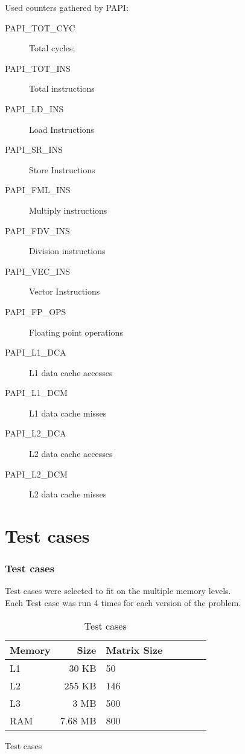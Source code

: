\documentclass{beamer}
\begin{document}
\begin{frame}
\begin{figure}[!htp]
\begin{frame}
	Used counters gathered by PAPI:
	\begin{description}
		\item[PAPI\_TOT\_CYC] Total cycles;
		\item[PAPI\_TOT\_INS] Total instructions
		\item[PAPI\_LD\_INS] Load Instructions
		\item[PAPI\_SR\_INS] Store Instructions
		\item[PAPI\_FML\_INS] Multiply instructions
		\item[PAPI\_FDV\_INS] Division instructions
		\item[PAPI\_VEC\_INS] Vector Instructions
		\item[PAPI\_FP\_OPS] Floating point operations
		\item[PAPI\_L1\_DCA] L1 data cache accesses
		\item[PAPI\_L1\_DCM] L1 data cache misses
		\item[PAPI\_L2\_DCA] L2 data cache accesses
		\item[PAPI\_L2\_DCM] L2 data cache misses
	\end{description}
\end{frame}

\section{Test cases}
\begin{frame}
	\frametitle{Test cases}

	Test cases were selected to fit on the multiple memory levels.\\
	Each Test case was run 4 times for each version of the problem.

	\begin{center}
		\begin{table}[!htp]
	\begin{tabular}{lrlrlrl}
		\hline
		\textbf{Memory} & \textbf{Size} & \textbf{Matrix Size} \\
		\hline
		L1 & 30 KB & 50 \\
		L2 & 255 KB & 146 \\
		L3 & 3 MB & 500 \\
		RAM & 7.68 MB & 800 \\
		\hline
	\end{tabular}
	\caption{Test cases}
	\label{tab:testcases}
\end{table}
	\end{center}
\end{frame}


\end{figure}
\end{frame}
\end{document}
